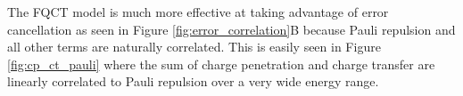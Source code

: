 \documentclass[journal=jctcce,manuscript=article]{achemso}
\begin{document}
The FQCT model is much more effective at taking advantage of error cancellation as seen in Figure \ref{fig:error_correlation}B because Pauli repulsion and all other terms are naturally correlated. This is easily seen in Figure \ref{fig:cp_ct_pauli} where the sum of charge penetration and charge transfer are linearly correlated to Pauli repulsion over a very wide energy range. %
\end{document}
